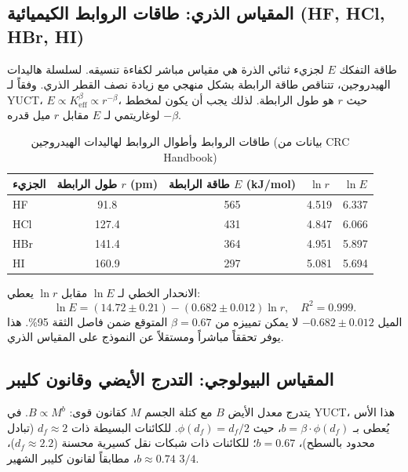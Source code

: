 \documentclass[11pt,a4paper]{article}
\begin{document}
	\subsection{المقياس الذري: طاقات الروابط الكيميائية (HF, HCl, HBr, HI)}
	\label{subsec:chem-bonds}
	
	طاقة التفكك $E$ لجزيء ثنائي الذرة هي مقياس مباشر لكفاءة تنسيقه. لسلسلة هاليدات الهيدروجين، تتناقص طاقة الرابطة بشكل منهجي مع زيادة نصف القطر الذري. وفقاً لـ YUCT، $E \propto K_{\mathrm{eff}}^{\beta} \propto r^{-\beta}$، حيث $r$ هو طول الرابطة. لذلك يجب أن يكون لمخطط لوغاريتمي لـ $E$ مقابل $r$ ميل قدره $-\beta$.
	
	\begin{table}[htbp]
		\centering
		\caption{طاقات الروابط وأطوال الروابط لهاليدات الهيدروجين (بيانات من CRC Handbook)}
		\label{tab:bond-data}
		\begin{english}
			\begin{tabular}{lcccc}
				\toprule
				الجزيء & طول الرابطة $r$ (pm) & طاقة الرابطة $E$ (kJ/mol) & $\ln r$ & $\ln E$ \\
				\midrule
				HF   & 91.8 & 565 & 4.519 & 6.337 \\
				HCl  & 127.4 & 431 & 4.847 & 6.066 \\
				HBr  & 141.4 & 364 & 4.951 & 5.897 \\
				HI   & 160.9 & 297 & 5.081 & 5.694 \\
				\bottomrule
			\end{tabular}
		\end{english}
	\end{table}
	
	الانحدار الخطي لـ $\ln E$ مقابل $\ln r$ يعطي:
	\[
	\ln E = (14.72 \pm 0.21) - (0.682 \pm 0.012) \ln r, \quad R^2 = 0.999.
	\]
	الميل $-0.682 \pm 0.012$ لا يمكن تمييزه من $\beta = 0.67$ المتوقع ضمن فاصل الثقة 95\%. هذا يوفر تحققاً مباشراً ومستقلاً عن النموذج على المقياس الذري.
	
	\subsection{المقياس البيولوجي: التدرج الأيضي وقانون كليبر}
	\label{subsec:metabolic-scaling}
	
	يتدرج معدل الأيض $B$ مع كتلة الجسم $M$ كقانون قوى: $B \propto M^{b}$. في YUCT، هذا الأس يُعطى بـ $b = \beta \cdot \phi(d_f)$، حيث $\phi(d_f) = d_f/2$. للكائنات البسيطة ذات $d_f \approx 2$ (تبادل محدود بالسطح)، $b = 0.67$؛ للكائنات ذات شبكات نقل كسيرية محسنة ($d_f \approx 2.2$)، $b \approx 0.74$، مطابقاً لقانون كليبر الشهير $3/4$.
	
\end{document}
